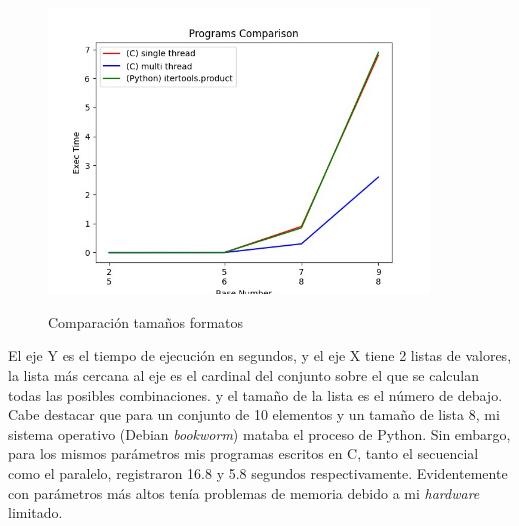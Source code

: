 \begin{figure}[h] %
    \centering
    \includegraphics[width=0.9\textwidth,keepaspectratio]{img/programs_comparison_graph.jpeg}
    \parbox{\linewidth}{\centering Comparación tamaños formatos}
    \label{fig:mi_imagen} 
\end{figure}
\noindent El eje Y es el tiempo de ejecución en segundos, y el eje X tiene 2 listas de valores, la lista más cercana al eje es el cardinal del conjunto sobre el que se calculan todas las posibles combinaciones. y el tamaño de la lista es el número de debajo. Cabe destacar que para un conjunto de 10 elementos y un tamaño de lista 8, mi sistema operativo (Debian \textit{bookworm}) mataba el proceso de Python. Sin embargo, para los mismos parámetros mis programas escritos en C, tanto el secuencial como el paralelo, registraron 16.8 y 5.8 segundos respectivamente. Evidentemente con parámetros más altos tenía problemas de memoria debido a mi \textit{hardware} limitado.